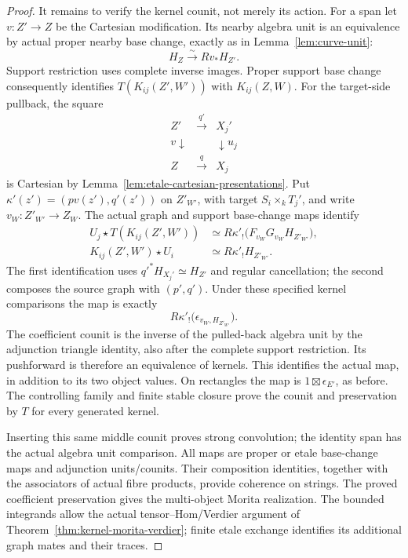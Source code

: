 \documentclass[11pt]{article}
\theoremstyle{definition}
\theoremstyle{remark}
\begin{document}
\begin{proof}
It remains to verify the kernel counit, not merely its action.
For a span let $v:Z'\to Z$ be the Cartesian modification. Its
nearby algebra unit is an equivalence by actual proper nearby base
change, exactly as in Lemma~\ref{lem:curve-unit}:
\[
 H_Z\xrightarrow{\sim}Rv_*H_{Z'}.
\]
Support restriction uses complete inverse images. Proper support
base change consequently identifies
$T(K_{ij}(Z',W'))$ with $K_{ij}(Z,W)$.
For the target-side pullback, the square
\[
 \begin{matrix}
 Z'&\xrightarrow{q'}&X_j'\\
 v\downarrow&&\downarrow u_j\\
 Z&\xrightarrow{q}&X_j
 \end{matrix}
\]
is Cartesian by Lemma~\ref{lem:etale-cartesian-presentations}.
Put $\kappa'(z')=(pv(z'),q'(z'))$ on $Z'_{W'}$, with target
$S_i\times_k T_j'$, and write $v_W:Z'_{W'}\to Z_W$.
The actual graph and support base-change maps identify
\[
 \begin{aligned}
 U_j\star T(K_{ij}(Z',W'))
  &\simeq R\kappa'_!\bigl(F_{v_W}G_{v_W}H_{Z'_{W'}}\bigr),\\
 K_{ij}(Z',W')\star U_i
  &\simeq R\kappa'_!H_{Z'_{W'}}.
 \end{aligned}
\]
The first identification uses
$q'^*H_{X_j'}\simeq H_{Z'}$ and regular cancellation; the second
composes the source graph with $(p',q')$. Under these specified
kernel comparisons the map is exactly
\[
 R\kappa'_!\bigl(\epsilon_{v_W,H_{Z'_{W'}}}\bigr).
\]
The coefficient counit is the inverse of the pulled-back algebra
unit by the adjunction triangle identity, also after the complete
support restriction. Its pushforward is therefore an equivalence
of kernels. This identifies the actual map, in addition to its
two object values.
On rectangles the map is $1\boxtimes\epsilon_{E'}$, as before.
The controlling family and finite stable closure prove the counit
and preservation by $T$ for every generated kernel.

Inserting this same middle counit proves strong convolution; the
identity span has the actual algebra unit comparison. All maps are
proper or etale base-change maps and adjunction units/counits.
Their composition identities, together with the associators of
actual fibre products, provide coherence on strings. The proved
coefficient preservation gives the multi-object Morita realization.
The bounded integrands allow the actual tensor--Hom/Verdier argument
of Theorem~\ref{thm:kernel-morita-verdier}; finite etale exchange
identifies its additional graph mates and their traces.


\end{proof}
\end{document}
